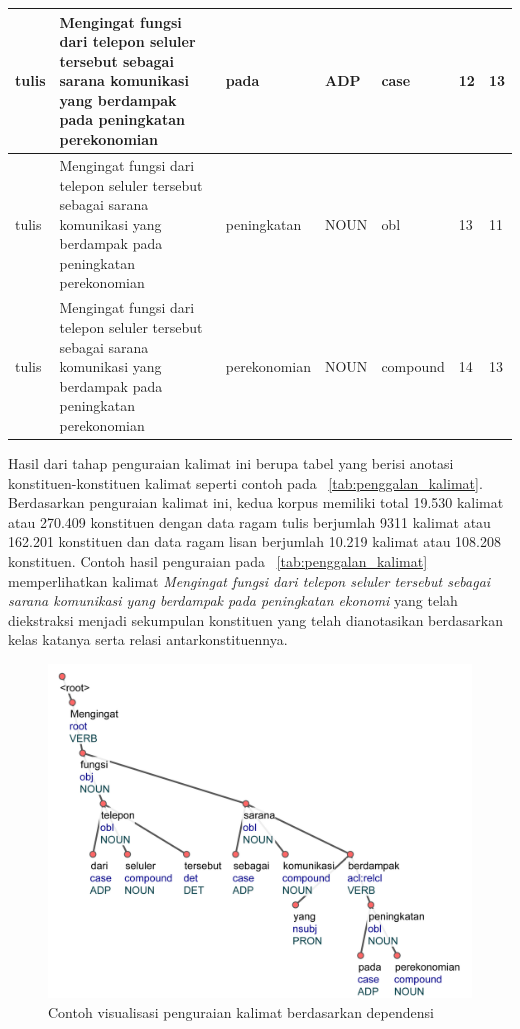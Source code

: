 \begin{center}
\begin{table}
\begin{tiny}
\begin{tabulary}{1\textwidth}{| L | L | L | L | L | L | L |}
tulis & Mengingat fungsi dari telepon seluler tersebut sebagai sarana komunikasi yang berdampak pada peningkatan perekonomian & pada & ADP & case & 12 & 13 \\ \hline
tulis & Mengingat fungsi dari telepon seluler tersebut sebagai sarana komunikasi yang berdampak pada peningkatan perekonomian & peningkatan & NOUN & obl & 13 & 11 \\ \hline
tulis & Mengingat fungsi dari telepon seluler tersebut sebagai sarana komunikasi yang berdampak pada peningkatan perekonomian & perekonomian & NOUN & compound & 14 & 13 \\ 
\hline
  \end{tabulary}  
\end{tiny}
\end{table}
\end{center}

Hasil dari tahap penguraian kalimat ini berupa tabel yang berisi anotasi konstituen-konstituen kalimat seperti contoh pada \tab~\ref{tab:penggalan_kalimat}. Berdasarkan penguraian kalimat ini, kedua korpus memiliki total 19.530 kalimat atau 270.409 konstituen dengan data ragam tulis berjumlah 9311 kalimat atau 162.201 konstituen dan data ragam lisan berjumlah 10.219 kalimat atau 108.208 konstituen. Contoh hasil penguraian pada \tab~\ref{tab:penggalan_kalimat} memperlihatkan kalimat \textit{Mengingat fungsi dari telepon seluler tersebut sebagai sarana komunikasi yang berdampak pada peningkatan ekonomi} yang telah diekstraksi menjadi sekumpulan konstituen yang telah dianotasikan berdasarkan kelas katanya serta relasi antarkonstituennya. 

\begin{figure}
	\centering \includegraphics[width=0.8
	\textwidth] {pics/visualisasi_penguraian.jpg} 
	\caption{Contoh visualisasi penguraian kalimat berdasarkan dependensi} 
\label{fig:visualisasi_penguraian} \end{figure}

